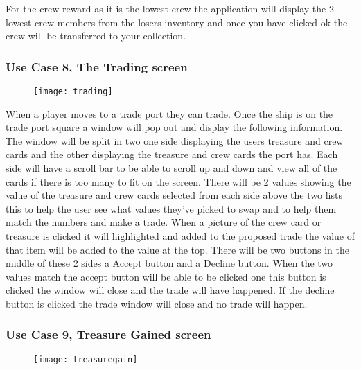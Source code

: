 \documentclass{article}
\begin{document}
		For the crew reward as it is the lowest crew the application will display the 2 lowest crew members from the losers inventory  and once you have clicked ok the crew will be transferred to your collection.
		
	
	\subsubsection{Use Case 8, The Trading screen}
	
		\begin{figure}[H]
		\centering
		\texttt{[image: trading]}
		\label{fig:trading}
		\end{figure}	
		
When a player moves to a trade port they can trade. Once the ship is on the trade port square a window will pop out and display the following information. The window will be split in two one side displaying the users treasure and crew cards and the other displaying the treasure and crew cards the port has. Each side will have a scroll bar to
be able to scroll up and down and view all of the cards if there is too many to fit on the screen. There will be 2 values showing the value of the treasure and crew cards selected from each side above the two lists this to help the user see what values they've picked to swap and to help them match the numbers and make a trade. When a picture of the crew
card or treasure is clicked it will highlighted and added to the proposed trade the value of that item will be added to the value at the top. There will be two buttons in the middle of these 2 sides a Accept button and a Decline button. When the two values 
match the accept button will be able to be clicked one this button is clicked the window will close and the trade will have happened. If the decline button is clicked the trade window will close and no trade will happen.

\subsubsection{Use Case 9, Treasure Gained screen}
	
		\begin{figure}[H]
		\centering
		\texttt{[image: treasuregain]}
		\label{fig:treasuregain}
		\end{figure}
\end{document}
